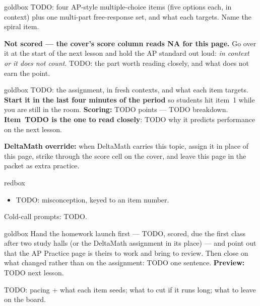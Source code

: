\documentclass[10pt]{article}
\begin{document}
\boxguard
\begin{skillbox}{goldbox}
TODO: four AP-style multiple-choice items (five options each, in context) plus one multi-part
free-response set, and what each targets. Name the spiral item.

\textbf{Not scored --- the cover's score column reads \textbf{NA} for this page.} Go over it at
the start of the next lesson and hold the AP standard out loud: \emph{in context or it does not
count}. TODO: the part worth reading closely, and what does not earn the point.
\end{skillbox}

\boxguard
\begin{skillbox}{goldbox}
TODO: the assignment, in fresh contexts, and what each item targets. \textbf{Start it in the last
four minutes of the period} so students hit item~1 while you are still in the room.
\textbf{Scoring:} TODO points --- TODO breakdown. \textbf{Item~TODO is the one to read closely}:
TODO why it predicts performance on the next lesson.

\textbf{DeltaMath override:} when DeltaMath carries this topic, assign it in place of this page,
strike through the score cell on the cover, and leave this page in the packet as extra practice.
\end{skillbox}

\boxguard
\begin{skillbox}{redbox}
\begin{itemize}[leftmargin=1.2em, nosep]
  \item TODO: misconception, keyed to an item number.
\end{itemize}
Cold-call prompts: TODO.
\end{skillbox}

\boxguard
\begin{skillbox}{goldbox}
Hand the homework launch first --- TODO, scored, due the first class after two study halls (or the DeltaMath assignment in
its place) --- and point out that the AP Practice page is theirs to work and bring to review.
Then close on what changed rather than on the assignment: TODO one sentence.
\textbf{Preview:} TODO next lesson.
\end{skillbox}

\begin{teachernote}[Warm-Up]
TODO: pacing + what each item seeds; what to cut if it runs long; what to leave on the board.
\end{teachernote}
\end{document}
